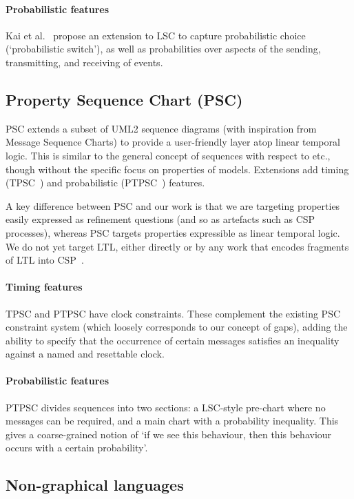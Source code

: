 \paragraph{Probabilistic features}
Kai et al.~\cite{Kai14-PLSC} propose an extension to LSC to capture
probabilistic choice (`probabilistic switch'), as well as
probabilities over aspects of the sending, transmitting, and receiving
of events.

\subsection{Property Sequence Chart (PSC)}

PSC extends a subset of UML2 sequence diagrams (with inspiration from
Message Sequence Charts) to provide a
user-friendly layer atop linear temporal logic.  This is
similar to the general concept of \langname{} sequences with respect to \tockcsp{}
etc., though without the
specific focus on properties of \robochart{} models.
Extensions add timing (TPSC~\cite{tpsc}) and
probabilistic (PTPSC~\cite{ptpsc}) features.

A key difference between PSC and our work is that we are
targeting  properties easily expressed as refinement questions
(and so as artefacts such as CSP processes), whereas PSC targets properties
expressible as linear temporal logic.  We do not yet target LTL,
either directly or by any work that encodes fragments of LTL into
CSP~\cite{fdrspin,Lowe08-CommunicatingProcessSpecification}.

\paragraph{Timing features}
TPSC and PTPSC have clock constraints.  These complement the existing PSC constraint system
(which loosely corresponds to our concept of gaps), adding the ability to
specify that the occurrence of certain messages satisfies an inequality against
a named and resettable clock.

\paragraph{Probabilistic features}
PTPSC divides sequences into two sections: a LSC-style pre-chart where no messages can be required,
and a main chart with a probability inequality.  This gives a coarse-grained notion of `if we see
this behaviour, then this behaviour occurs with a certain probability'.

\subsection{Non-graphical languages}

